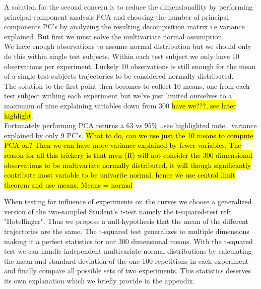 \documentclass{article}
\begin{document}
A solution for the second concern is to reduce the dimensionallity by performing principal component analysis PCA and choosing the number of principal components PC's by analyzing the resulting decompisition matrix i.e variance explained. But first we must solve the  multivariate normal assumption. \\
 We have enough observations to assume normal distribution but we should only do this within single test subjects. Within each test subject we only have 10 observations per experiment. Luckely 10 observations is still enough for the mean of a single test-subjects trajectories to be considered normally distributed. \\ The solution to the first point then becomes to collect 10 means, one from each test subject withing each experiment but we've just limited ourselves to a maximum of nine explaining variables down from 300 \hl{have we???, see later highlight}. \\
 Fortunately performing PCA returns a 63 vs 95\% ..see highlighted note.. variance explained by only 9 PC's. \hl{What to do, can we use just the 10 means to compute PCA on? Then we can have more variance explained by fewer variables. The reason for all this trickery is that mvn (R) will not consider the 300 dimensional observations to be multivariate normally distributed, it will though significantly contribute most variable to be univarite normal. hence we use central limit theorem and use means. Means = normal}

When testing for influence of experiments on the curves we choose a  generalized version of the two-sampled Student's t-test namely the t-squared-test ref: "Hotellinger". Thus we propose a null-hypothesis that the mean of the different trajectories are the same. The t-squared test generalizes to multiple dimensions making it a perfect statistics for our 300 dimensional means. With the t-squared test we can handle independent multivariate normal distributions by calculating the mean and standard deviation of the one 100 repetitions in each experiment and finally compare all possible sets of two experiments. This statistics deserves its own explanation which we briefly provide in the appendix.


\end{document}
